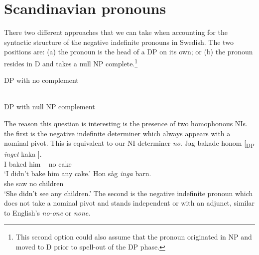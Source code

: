 \documentclass[12pt, letterpaper]{article}
\begin{document}
\section{Scandinavian pronouns} \label{sec:PRONOUNS}

\ea There two different approaches that we can take when accounting for the syntactic structure of the negative indefinite pronouns in Swedish. The two positions are: (a) the pronoun is the head of a DP on its own; or (b) the pronoun resides in D and takes a null NP complete.\footnote{This second option could also assume that the pronoun originated in NP and moved to D prior to spell-out of the DP phase.}
	\begin{multicols}{2}
	\begin{xlist}
		\ex DP with no complement \label{ex:NNP}\\
		\vspace{2em}\\
		\ex DP with null NP complement \label{ex:DN} \\
	\end{xlist}
	\end{multicols}
\ex The reason this question is interesting is the presence of two homophonous NIs. 
	\ea the first is the negative indefinite determiner which always appears with a nominal pivot. This is equivalent to our NI determiner \emph{no}.
		\ea 
		\gll Jag bakade honom [\textsubscript{DP} \emph{inget} kaka ].\\
		I baked him ~ no cake\\
		\glt `I didn't bake him any cake.'  
		\ex 
		\gll Hon såg \emph{inga} barn.\\
		she saw no children\\
		\glt `She didn't see any children.'
		\z  
	\ex The second is the negative indefinite pronoun which does not take a nominal pivot and stands independent or with an adjunct, similar to English's \emph{no-one} or \emph{none}.
\end{document}
